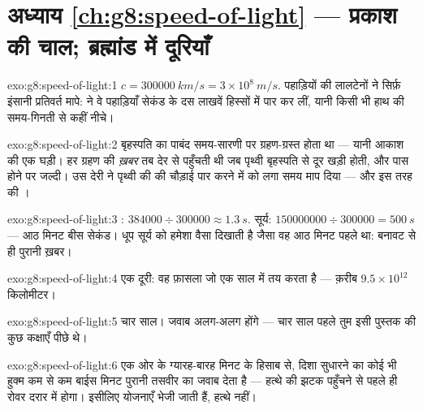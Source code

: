 \section*{अध्याय \ref{ch:g8:speed-of-light} --- प्रकाश की चाल; ब्रह्मांड में दूरियाँ}

\begin{solution}{exo:g8:speed-of-light:1}
$c = \qty{300000}{km/s} = 3 \times 10^{8}\ \unit{m/s}$. पहाड़ियों की
लालटेनों ने सिर्फ़ इंसानी प्रतिवर्त मापे:  ने वे पहाड़ियाँ सेकंड
के दस लाखवें हिस्सों में पार कर लीं, यानी किसी भी हाथ की समय-गिनती से
कहीं नीचे।
\end{solution}

\begin{solution}{exo:g8:speed-of-light:2}
बृहस्पति का  पाबंद समय-सारणी पर ग्रहण-ग्रस्त होता था --- यानी
आकाश की एक घड़ी। हर ग्रहण की \emph{ख़बर} तब देर से पहुँचती थी जब पृथ्वी
बृहस्पति से दूर खड़ी होती, और पास होने पर जल्दी। उस देरी ने पृथ्वी की
 की चौड़ाई पार करने में  को लगा समय माप दिया --- और इस तरह
 की ।
\end{solution}

\begin{solution}{exo:g8:speed-of-light:3}
: $384000 \div 300000 \approx \qty{1.3}{s}$. सूर्य:
$150000000 \div 300000 = \qty{500}{s}$ --- आठ मिनट बीस सेकंड।
धूप सूर्य को हमेशा वैसा दिखाती है जैसा वह आठ मिनट पहले था: बनावट से ही
पुरानी ख़बर।
\end{solution}

\begin{solution}{exo:g8:speed-of-light:4}
एक दूरी: वह फ़ासला जो  एक साल में तय करता है --- क़रीब
$9.5 \times 10^{12}$ किलोमीटर।
\end{solution}

\begin{solution}{exo:g8:speed-of-light:5}
चार साल। जवाब अलग-अलग होंगे --- चार साल पहले तुम इसी पुस्तक की कुछ
कक्षाएँ पीछे थे।
\end{solution}

\begin{solution}{exo:g8:speed-of-light:6}
एक ओर के ग्यारह-बारह मिनट के हिसाब से, दिशा सुधारने का कोई भी हुक्म कम
से कम बाईस मिनट पुरानी तसवीर का जवाब देता है --- हत्थे की झटक पहुँचने
से पहले ही रोवर दरार में होगा। इसीलिए योजनाएँ भेजी जाती हैं, हत्थे
नहीं।
\end{solution}

